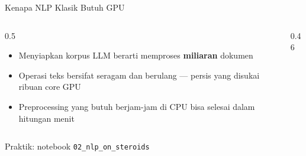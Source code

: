 \documentclass[aspectratio=169,t]{beamer}
\begin{document}
\begin{frame}{Kenapa NLP Klasik Butuh GPU}
  \begin{columns}[T]
    \begin{column}{0.5\textwidth}
      \begin{itemize}
        \footnotesize
        \item Menyiapkan korpus LLM berarti memproses \textbf{miliaran} dokumen
        \item Operasi teks bersifat seragam dan berulang --- persis yang disukai ribuan core GPU
        \item Preprocessing yang butuh berjam-jam di CPU bisa selesai dalam hitungan menit
      \end{itemize}
    \end{column}
    \begin{column}{0.46\textwidth}
      \begin{center}
      \end{center}
    \end{column}
  \end{columns}
  \vspace{0.6em}
  \centering\footnotesize\textcolor{nvgray}{Praktik: notebook \texttt{02\_nlp\_on\_steroids}}
\end{frame}
\end{document}
